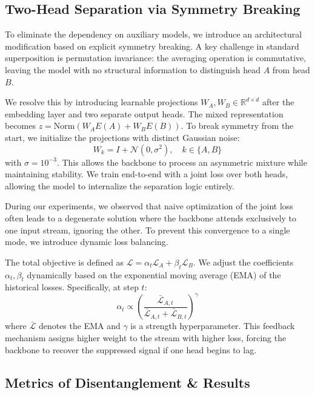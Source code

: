 \documentclass{article}
\theoremstyle{plain}
\theoremstyle{definition}
\theoremstyle{remark}
\begin{document}
\subsection{Two-Head Separation via Symmetry Breaking}

To eliminate the dependency on auxiliary models, we introduce an architectural modification based on explicit symmetry breaking. A key challenge in standard superposition is permutation invariance: the averaging operation is commutative, leaving the model with no structural information to distinguish head $A$ from head $B$.

We resolve this by introducing learnable projections $W_A, W_B \in \mathbb{R}^{d \times d}$ after the embedding layer and two separate output heads. The mixed representation becomes $z = \text{Norm}(W_A E(A) + W_B E(B))$. To break symmetry from the start, we initialize the projections with distinct Gaussian noise:
\begin{equation}
    W_k = I + \mathcal{N}(0, \sigma^2), \quad k \in \{A, B\}
\end{equation}
with $\sigma=10^{-3}$. This allows the backbone to process an asymmetric mixture while maintaining stability. We train end-to-end with a joint loss over both heads, allowing the model to internalize the separation logic entirely.

During our experiments, we observed that naive optimization of the joint loss often leads to a degenerate solution where the backbone attends exclusively to one input stream, ignoring the other. To prevent this convergence to a single mode, we introduce dynamic loss balancing.

The total objective is defined as $\mathcal{L} = \alpha_t \mathcal{L}_A + \beta_t \mathcal{L}_B$. We adjust the coefficients $\alpha_t, \beta_t$ dynamically based on the exponential moving average (EMA) of the historical losses. Specifically, at step $t$:
\begin{equation}
    \alpha_t \propto \left( \frac{\bar{\mathcal{L}}_{A,t}}{\bar{\mathcal{L}}_{A,t} + \bar{\mathcal{L}}_{B,t}} \right)^\gamma
\end{equation}
where $\bar{\mathcal{L}}$ denotes the EMA and $\gamma$ is a strength hyperparameter. This feedback mechanism assigns higher weight to the stream with higher loss, forcing the backbone to recover the suppressed signal if one head begins to lag.

\subsection{Metrics of Disentanglement \& Results}
\label{subsec:metrics_of_disentanglement_results}
\end{document}
